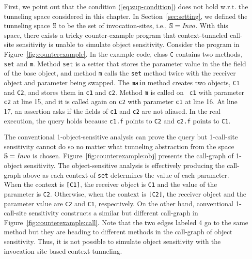 First, we point out that the condition (\ref{eq:sup-condition}) does not hold w.r.t. the tunneling space considered in this chapter. 
In Section~\ref{sec:setting}, we defined the tunneling space $\mathbb{S}$ to be the set of invocation-sites, i.e., $\mathbb{S} = \text{\it Invo}$. 
With this space, there exists a tricky counter-example program that context-tunneled
call-site sensitivity is unable to simulate object sensitivity.
Consider the program in Figure~\ref{fig:counterexample}. 
In the example code, class {\tt C} contains two methods, {\tt set} and {\tt m}.
Method {\tt set} is a setter that stores the parameter value in the
the field of the base object,
and method {\tt m} calls the {\tt set} method twice
with the receiver object and parameter being swapped.
The {\tt main} method creates two objects, {\tt C1} and {\tt C2}, and
stores them in {\tt c1} and {\tt c2}. Method {\tt m} is called on {\tt
  c1} with parameter {\tt c2} at line 15, and it is called again on
{\tt c2} with parameter {\tt c1} at line 16.
At line 17, an assertion asks if
the fields of {\tt c1} and {\tt c2} are not aliased.
In the real execution, the query holds because {\tt c1.f} points to {\tt C2} and
{\tt c2.f} points to {\tt C1}.

The conventional 1-object-sensitive analysis can prove the query but
1-call-site sensitivity cannot do so no matter what tunneling abstraction from the space $\mathbb{S} = \text{\it Invo}$ is
chosen.
Figure~\ref{fig:counterexample:obj} presents
the call-graph of 1-object sensitivity.
The object-sensitive analysis is effectively producing the call-graph above as
each context of {\tt set} determines the value of each parameter.
When the context is {\tt [C1]}, the receiver object is {\tt C1} and the value of the parameter is {\tt C2}.
Otherwise, when the context is {\tt [C2]}, the receiver object and the
parameter value are  {\tt C2} and {\tt C1}, respectively.
On the other hand, conventional 1-call-site sensitivity constructs a similar but
different call-graph in Figure~\ref{fig:counterexample:call}.
Note that the two edges labeled 4 go
to the same method but they are heading to different methods in the call-graph of object sensitivity. 
Thus, it is not possible to simulate object sensitivity with the invocation-site-based context tunneling. 




